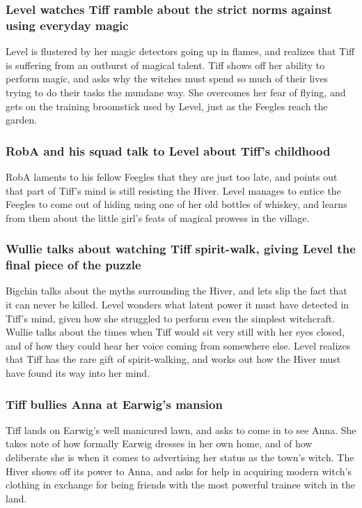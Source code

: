 \subsubsection{\Gls{Level} watches \Gls{Tiff} ramble about the strict norms against using
    everyday magic}
\Gls{Level} is flustered by her magic detectors going up in flames, and realizes that \Gls{Tiff} is
suffering from an outburst of magical talent. \Gls{Tiff} shows off her ability to perform magic,
and asks why the witches must spend so much of their lives trying to do their tasks the mundane way.
She overcomes her fear of flying, and gets on the training broomstick used by \Gls{Level}, just
as the Feegles reach the garden.

\subsubsection{\Gls{RobA} and his squad talk to \Gls{Level} about \Gls{Tiff}'s childhood}
\Gls{RobA} laments to his fellow Feegles that they are just too late, and points out that part of
\Gls{Tiff}'s mind is still resisting the \Gls{Hiver}. \Gls{Level} manages to entice the Feegles to
come out of hiding using one of her old bottles of whiskey, and learns from them about the little
girl's feats of magical prowess in the village.

\subsubsection{\Gls{Wullie} talks about watching \Gls{Tiff} spirit-walk, giving \Gls{Level} the
    final piece of the puzzle}
\Gls{Bigchin} talks about the myths surrounding the \Gls{Hiver}, and lets slip the fact that it
can never be killed. \Gls{Level} wonders what latent power it must have detected in \Gls{Tiff}'s
mind, given how she struggled to perform even the simplest witchcraft. \Gls{Wullie} talks about the
times when \Gls{Tiff} would sit very still with her eyes closed, and of how they could hear her
voice coming from somewhere else. \Gls{Level} realizes that \Gls{Tiff} has the rare gift of
spirit-walking, and works out how the \Gls{Hiver} must have found its way into her mind.

\subsubsection{\Gls{Tiff} bullies \Gls{Anna} at \Gls{Earwig}'s mansion}
\Gls{Tiff} lands on \Gls{Earwig}'s well manicured lawn, and asks to come in to see \Gls{Anna}. She
takes note of how formally \Gls{Earwig} dresses in her own home, and of how deliberate she is when
it comes to advertising her status as the town's witch. The \Gls{Hiver} shows off its power to
\Gls{Anna}, and asks for help in acquiring modern witch's clothing in exchange for being friends
with the most powerful trainee witch in the land.

